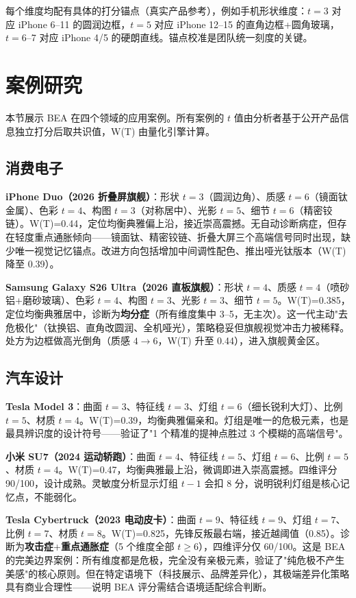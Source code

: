 \documentclass[10pt,a4paper]{article}
\begin{document}
每个维度均配有具体的打分锚点（真实产品参考），例如手机形状维度：$t=3$ 对应 iPhone 6--11 的圆润边框，$t=5$ 对应 iPhone 12--15 的直角边框+圆角玻璃，$t=6$--7 对应 iPhone 4/5 的硬朗直线。锚点校准是团队统一刻度的关键。

\section{案例研究}

本节展示 BEA 在四个领域的应用案例。所有案例的 $t$ 值由分析者基于公开产品信息独立打分后取共识值，W(T) 由量化引擎计算。

\subsection{消费电子}

\textbf{iPhone Duo（2026 折叠屏旗舰）}：形状 $t=3$（圆润边角）、质感 $t=6$（镜面钛金属）、色彩 $t=4$、构图 $t=3$（对称居中）、光影 $t=5$、细节 $t=6$（精密铰链）。W(T)=0.44，定位均衡典雅偏上沿，接近崇高震撼。无自动诊断病症，但存在轻度重点通胀倾向——镜面钛、精密铰链、折叠大屏三个高端信号同时出现，缺少唯一视觉记忆锚点。改进方向包括增加中间调性配色、推出哑光钛版本（W(T) 降至 0.39）。

\textbf{Samsung Galaxy S26 Ultra（2026 直板旗舰）}：形状 $t=4$、质感 $t=4$（喷砂铝+磨砂玻璃）、色彩 $t=4$、构图 $t=3$、光影 $t=3$、细节 $t=5$。W(T)=0.385，定位均衡典雅居中，诊断为\textbf{均分症}（所有维度集中 3--5，无主次）。这一代主动"去危极化"（钛换铝、直角改圆润、全机哑光），策略稳妥但旗舰视觉冲击力被稀释。处方为边框做高光倒角（质感 $4\rightarrow6$，W(T) 升至 0.44），进入旗舰黄金区。

\subsection{汽车设计}

\textbf{Tesla Model 3}：曲面 $t=3$、特征线 $t=3$、灯组 $t=6$（细长锐利大灯）、比例 $t=5$、材质 $t=4$。W(T)=0.39，均衡典雅偏亲和。灯组是唯一的危极元素，也是最具辨识度的设计符号——验证了"1 个精准的提神点胜过 3 个模糊的高端信号"。

\textbf{小米 SU7（2024 运动轿跑）}：曲面 $t=4$、特征线 $t=5$、灯组 $t=6$、比例 $t=5$、材质 $t=4$。W(T)=0.47，均衡典雅最上沿，微调即进入崇高震撼。四维评分 90/100，设计成熟。灵敏度分析显示灯组 $t-1$ 会扣 8 分，说明锐利灯组是核心记忆点，不能弱化。

\textbf{Tesla Cybertruck（2023 电动皮卡）}：曲面 $t=9$、特征线 $t=9$、灯组 $t=7$、比例 $t=7$、材质 $t=8$。W(T)=0.825，先锋反叛最右端，接近越阈值（0.85）。诊断为\textbf{攻击症}+\textbf{重点通胀症}（5 个维度全部 $t\geq6$），四维评分仅 60/100。这是 BEA 的完美边界案例：所有维度都是危极，完全没有亲极元素，验证了"纯危极不产生美感"的核心原则。但在特定语境下（科技展示、品牌差异化），其极端差异化策略具有商业合理性——说明 BEA 评分需结合语境适配综合判断。
\end{document}

